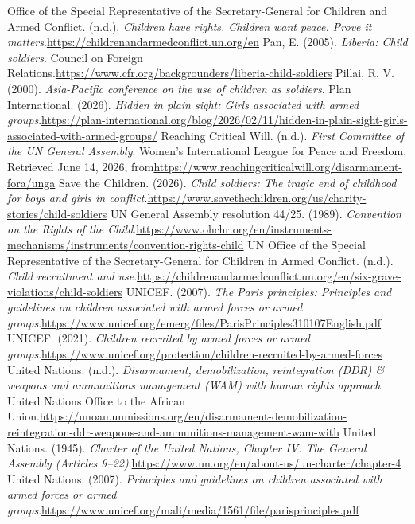 \begin{referencelist}
   Office of the Special Representative of the Secretary-General for Children and Armed Conflict. (n.d.). \emph{Children have rights. Children want peace. Prove it matters}.\url{https://childrenandarmedconflict.un.org/en}
   Pan, E. (2005). \emph{Liberia: Child soldiers}. Council on Foreign Relations.\url{https://www.cfr.org/backgrounders/liberia-child-soldiers}
   Pillai, R. V. (2000). \emph{Asia-Pacific conference on the use of children as soldiers}.
   Plan International. (2026). \emph{Hidden in plain sight: Girls associated with armed groups}.\url{https://plan-international.org/blog/2026/02/11/hidden-in-plain-sight-girls-associated-with-armed-groups/}
   Reaching Critical Will. (n.d.). \emph{First Committee of the UN General Assembly}. Women's International League for Peace and Freedom. Retrieved June 14, 2026, from\url{https://www.reachingcriticalwill.org/disarmament-fora/unga}
   Save the Children. (2026). \emph{Child soldiers: The tragic end of childhood for boys and girls in conflict}.\url{https://www.savethechildren.org/us/charity-stories/child-soldiers}
   UN General Assembly resolution 44/25. (1989). \emph{Convention on the Rights of the Child}.\url{https://www.ohchr.org/en/instruments-mechanisms/instruments/convention-rights-child}
   UN Office of the Special Representative of the Secretary-General for Children in Armed Conflict. (n.d.). \emph{Child recruitment and use}.\url{https://childrenandarmedconflict.un.org/en/six-grave-violations/child-soldiers}
   UNICEF. (2007). \emph{The Paris principles: Principles and guidelines on children associated with armed forces or armed groups}.\url{https://www.unicef.org/emerg/files/ParisPrinciples310107English.pdf}
   UNICEF. (2021). \emph{Children recruited by armed forces or armed groups}.\url{https://www.unicef.org/protection/children-recruited-by-armed-forces}
   United Nations. (n.d.). \emph{Disarmament, demobilization, reintegration (DDR) \& weapons and ammunitions management (WAM) with human rights approach}. United Nations Office to the African Union.\url{https://unoau.unmissions.org/en/disarmament-demobilization-reintegration-ddr-weapons-and-ammunitions-management-wam-with}
   United Nations. (1945). \emph{Charter of the United Nations, Chapter IV: The General Assembly (Articles 9–22)}.\url{https://www.un.org/en/about-us/un-charter/chapter-4}
   United Nations. (2007). \emph{Principles and guidelines on children associated with armed forces or armed groups}.\url{https://www.unicef.org/mali/media/1561/file/parisprinciples.pdf}

\end{referencelist}
